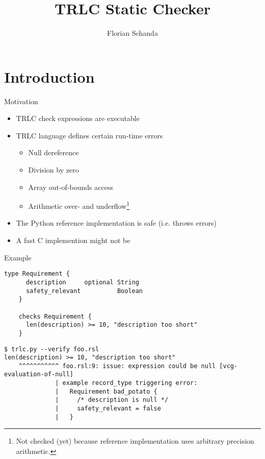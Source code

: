 \documentclass[aspectratio=169]{beamer}
\author{Florian Schanda}
\title{TRLC Static Checker}
\begin{document}
\section{Introduction}
\begin{frame}{Motivation}
  \begin{itemize}
  \item TRLC check expressions are executable
  \item TRLC language defines certain run-time errors
    \begin{itemize}
    \item Null dereference
    \item Division by zero
    \item Array out-of-bounds access
    \item Arithmetic over- and underflow\footnote{Not checked (yet) because reference implementation uses arbitrary precision arithmetic.}
    \end{itemize}
  \item The Python reference implementation is safe (i.e. throws errors)
  \item A fast C implemention might not be
  \end{itemize}
\end{frame}

\begin{frame}[fragile]{Example}
  \begin{lstlisting}[language=TRLC,gobble=4]
    type Requirement {
      description     optional String
      safety_relevant          Boolean
    }

    checks Requirement {
      len(description) >= 10, "description too short"
    }
  \end{lstlisting}
  \pause
  \begin{scriptsize}
\begin{verbatim}
$ trlc.py --verify foo.rsl
len(description) >= 10, "description too short"
    ^^^^^^^^^^^ foo.rsl:9: issue: expression could be null [vcg-evaluation-of-null]
              | example record_type triggering error:
              |   Requirement bad_potato {
              |     /* description is null */
              |     safety_relevant = false
              |   }
\end{verbatim}
  \end{scriptsize}
\end{frame}
\end{document}
